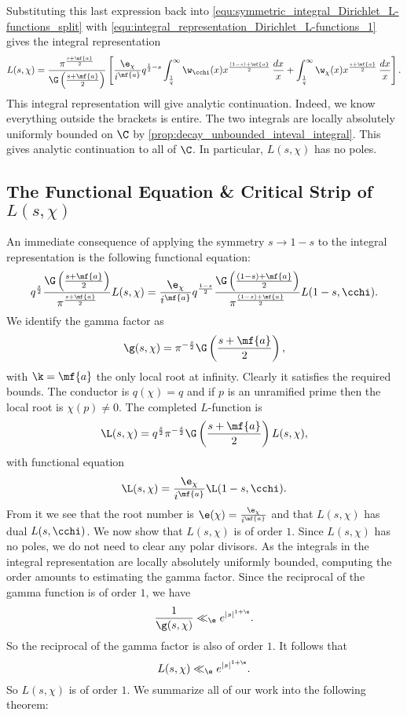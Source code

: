       Substituting this last expression back into \cref{equ:symmetric_integral_Dirichlet_L-functions_split} with \cref{equ:integral_representation_Dirichlet_L-functions_1} gives the integral representation
      \[
        L(s,\chi) = \frac{\pi^{\frac{s+\mf{a}}{2}}}{\G\left(\frac{s+\mf{a}}{2}\right)}\left[\frac{\e_{\chi}}{i^{\mf{a}}}q^{\frac{1}{2}-s}\int_{\frac{1}{q}}^{\infty}\w_{\cchi}(x)x^{\frac{(1-s)+\mf{a}}{2}}\,\frac{dx}{x}+\int_{\frac{1}{q}}^{\infty}\w_{\chi}(x)x^{\frac{s+\mf{a}}{2}}\,\frac{dx}{x}\right].
      \]
      This integral representation will give analytic continuation. Indeed, we know everything outside the brackets is entire. The two integrals are locally absolutely uniformly bounded on $\C$ by \cref{prop:decay_unbounded_inteval_integral}. This gives analytic continuation to all of $\C$. In particular, $L(s,\chi)$ has no poles.
    \subsection*{The Functional Equation \& Critical Strip of \texorpdfstring{$L(s,\chi)$}{L(s,\chi)}}
      An immediate consequence of applying the symmetry $s \to 1-s$ to the integral representation is the following functional equation:
      \[
        q^{\frac{s}{2}}\frac{\G\left(\frac{s+\mf{a}}{2}\right)}{\pi^{\frac{s+\mf{a}}{2}}}L(s,\chi) = \frac{\e_{\chi}}{i^{\mf{a}}}q^{\frac{1-s}{2}}\frac{\G\left(\frac{(1-s)+\mf{a}}{2}\right)}{\pi^{\frac{(1-s)+\mf{a}}{2}}}L(1-s,\cchi).
      \]
      We identify the gamma factor as
      \[
        \g(s,\chi) = \pi^{-\frac{s}{2}}\G\left(\frac{s+\mf{a}}{2}\right),
      \]
      with $\k = \mf{a}$ the only local root at infinity. Clearly it satisfies the required bounds. The conductor is $q(\chi) = q$ and if $p$ is an unramified prime then the local root is $\chi(p) \neq 0$. The completed $L$-function is
      \[
        \L(s,\chi) = q^{\frac{s}{2}}\pi^{-\frac{s}{2}}\G\left(\frac{s+\mf{a}}{2}\right)L(s,\chi),
      \]
      with functional equation
      \[
        \L(s,\chi) = \frac{\e_{\chi}}{i^{\mf{a}}}\L(1-s,\cchi).
      \]
      From it we see that the root number is $\e(\chi) = \frac{\e_{\chi}}{i^{\mf{a}}}$ and that $L(s,\chi)$ has dual $L(s,\cchi)$. We now show that $L(s,\chi)$ is of order $1$. Since $L(s,\chi)$ has no poles, we do not need to clear any polar divisors. As the integrals in the integral representation are locally absolutely uniformly bounded, computing the order amounts to estimating the gamma factor. Since the reciprocal of the gamma function is of order $1$, we have
      \[
        \frac{1}{\g(s,\chi)} \ll_{\e} e^{|s|^{1+\e}}.
      \]
      So the reciprocal of the gamma factor is also of order $1$. It follows that
      \[
        L(s,\chi) \ll_{\e} e^{|s|^{1+\e}}.
      \]
      So $L(s,\chi)$ is of order $1$. We summarize all of our work into the following theorem:

